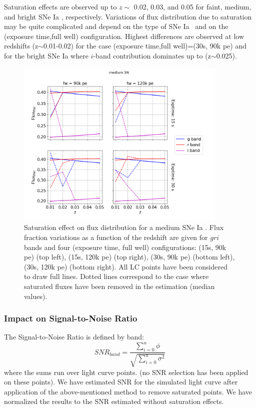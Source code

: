 \documentclass[\docopts]{\docclass}
\newcommand{\sne}{{SNe Ia }}
\newcommand{\pe}{{pe}}
\begin{document}
Saturation effects are observed up to $z\sim$ 0.02, 0.03, and 0.05 for faint, medium, and bright \sne, respectively. Variations of flux distribution due to saturation may be quite complicated and depend on the type of \sne~and on the (exposure time,full well) configuration. Highest differences are observed at low redshifts (z$\sim$0.01-0.02) for the case (exposure time,full well)=(30s, 90k \pe) and for the bright \sne where $i$-band contribution dominates up to (z$\sim$0.025).

\begin{figure}[htbp]
\begin{center}
  \includegraphics[width=0.9\textwidth]{Flux_medium.png}
 \caption{Saturation effect on flux distribution for a medium \sne. Flux fraction variations as a function of the redshift are given for $gri$ bands and four (exposure time, full well) configurations: (15s, 90k \pe) (top left),  (15s, 120k \pe) (top right), (30s, 90k \pe) (bottom left),  (30s, 120k \pe) (bottom right). All LC points have been considered to draw full lines. Dotted lines correspond to the case where saturated fluxes have been removed in the estimation (median values).}\label{fig:fluxmedium}
\end{center}
\end{figure}

\subsubsection{Impact on Signal-to-Noise Ratio}
The Signal-to-Noise Ratio is defined by band:
\begin{equation}
 SNR_{band} = \frac{\displaystyle \sum_{i=0}^{n}  \phi}{\sqrt{\displaystyle \sum_{i=0}^{n}  \sigma^2}}
\end{equation}
where the sums run over light curve points. (no SNR selection has been applied on these points). We have estimated SNR for the simulated light curve after application of the above-mentioned method to remove saturated points. We have normalized the results to the SNR estimated without saturation effects. 
\end{document}

